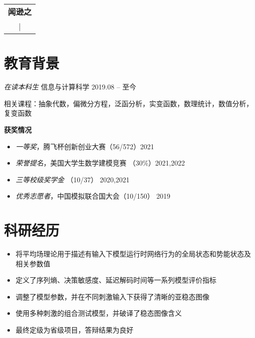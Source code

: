 \documentclass{resume}
\begin{document}
\begin{table}
  \centering
  \begin{tabu}{ c }
    \centering
    \textbf{\huge{闻逊之}}   \\
     |  \\
  \end{tabu}
\end{table}

\vspace{2pt}
\section{教育背景}
\textit{在读本科生} \quad 信息与计算科学 \hfill{2019.08 -- 至今}

相关课程：抽象代数，偏微分方程，泛函分析，实变函数，数理统计，数值分析，复变函数

\textbf{获奖情况}
\begin{itemize}
  \item \textit{一等奖}，腾飞杯创新创业大赛（56/572）\hfill 2021
  \item \textit{荣誉提名}，美国大学生数学建模竞赛 （30\%）\hfill 2021,2022
  \item \textit{三等校级奖学金} （10/37） \hfill 2020,2021
  \item \textit{优秀志愿者}，中国模拟联合国大会（10/150） \hfill 2019
\end{itemize}

\section{科研经历}

\begin{itemize}
  \item 将平均场理论用于描述有输入下模型运行时网络行为的全局状态和势能状态及相关参数值
  \item 定义了序列熵、决策敏感度、延迟解码时间等一系列模型评价指标
  \item 调整了模型参数，并在不同刺激输入下获得了清晰的亚稳态图像
  \item 使用多种刺激的组合测试模型，并破译了稳态图像含义
  \item 最终定级为省级项目，答辩结果为良好
\end{itemize}
\end{document}
